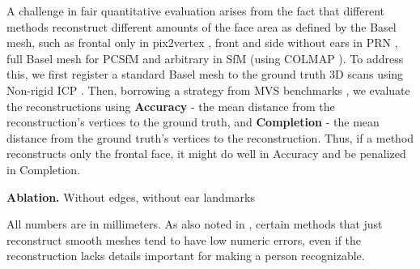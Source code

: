 \documentclass[10pt,twocolumn,letterpaper]{article}
\begin{document}
A challenge in fair quantitative evaluation arises from the fact that different methods reconstruct different amounts of the face area as defined by the Basel mesh, such as frontal only in pix2vertex \cite{sela2017unrestricted} , front and side without ears in PRN \cite{feng2018joint}, full Basel mesh for PCSfM \cite{hernandez2017accurate} and arbitrary in SfM (using COLMAP \cite{schonberger2016structure}). To address this, we first register a standard Basel mesh to the ground truth 3D scans using Non-rigid ICP \cite{amberg2007optimal,booth2018large}. Then, borrowing a strategy from MVS benchmarks \cite{jensen2014large,knapitsch2017tanks,yao2018mvsnet}, we evaluate the reconstructions using \textbf{Accuracy} - the mean distance from the reconstruction's vertices to the ground truth, and \textbf{Completion} - the mean distance from the ground truth's vertices to the reconstruction. Thus, if a method reconstructs only the frontal face, it might do well in Accuracy and be penalized in Completion.

\textbf{Ablation.} Without edges, without ear landmarks

All numbers are in millimeters. As also noted in \cite{hernandez2017accurate}, certain methods that just reconstruct smooth meshes tend to have low numeric errors, even if the reconstruction lacks details important for making a person recognizable.


\end{document}

